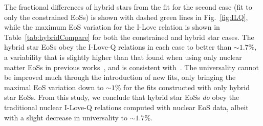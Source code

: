 \documentclass[prd,twocolumn,nofootinbib,superscriptaddress,amsmath,amssymb]{revtex4-1}
\begin{document}
The fractional differences of hybrid stars from the fit for the second case (fit to only the constrained EoSs) is shown with dashed green lines in Fig.~\ref{fig:ILQ}, while the maximum EoS variation for the I-Love relation is shown in Table~\ref{tab:hybridCompare} for both the constrained and hybrid star cases. The hybrid star EoSs obey the I-Love-Q relations in each case to better than $\sim1.7$\%, a variability that is slightly higher than that found when using only nuclear matter EoSs in previous works~\cite{Yagi:2013bca,Yagi:ILQ}, and is consistent with~\cite{Paschalidis2018}. The universality cannot be improved much through the introduction of new fits, only bringing the maximal EoS variation down to $\sim1$\% for the fits constructed with only hybrid star EoSs. From this study, we conclude that hybrid star EoSs \emph{do} obey the traditional nuclear I-Love-Q relations computed with nuclear EoS data, albeit with a slight decrease in universality to $\sim1.7$\%.  

\end{document}
